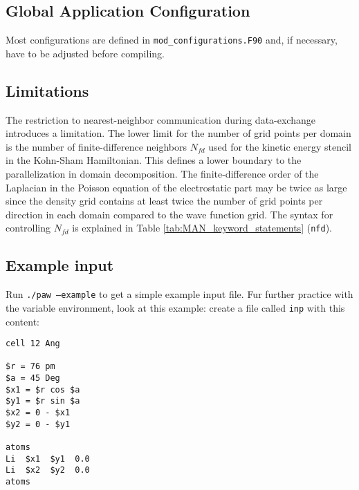 \documentclass[12pt,BCOR8mm,noappendixprefix,nochapterprefix,bibtotoc,idxtotoc,openbib,tablecaptionabove]{scrbook}
\newcommand{\ttt}[1]{\texttt{#1}}
\begin{document}
\subsection{Global Application Configuration} \label{sec:MAN_configuration}

Most configurations are defined in \ttt{mod\_configurations.F90} 
and, if necessary, have to be adjusted before compiling.

\subsection{Limitations} \label{sec:MAN_limitations}

The restriction to nearest-neighbor communication during data-exchange introduces a limitation. 
The lower limit for the number of grid points per domain is the number of 
finite-difference neighbors $N_{fd}$ used for the kinetic energy stencil in the Kohn-Sham Hamiltonian. 
This defines a lower boundary to the parallelization in domain decomposition. 
The finite-difference order of the Laplacian in the Poisson equation of the electrostatic 
part may be twice as large since the density grid contains at least twice the number of 
grid points per direction in each domain compared to the wave function grid. 
The syntax for controlling $N_{fd}$ is explained in Table \ref{tab:MAN_keyword_statements} (\ttt{nfd}).


\subsection{Example input} \label{sec:MAN_example}
Run \ttt{./paw --example} to get a simple example input file. 
Fur further practice with the variable environment, look at this example: create a file called \ttt{inp} with this content:

\begin{verbatim}
cell 12 Ang

$r = 76 pm
$a = 45 Deg
$x1 = $r cos $a
$y1 = $r sin $a
$x2 = 0 - $x1
$y2 = 0 - $y1

atoms
Li  $x1  $y1  0.0
Li  $x2  $y2  0.0
atoms
\end{verbatim}
\end{document}
